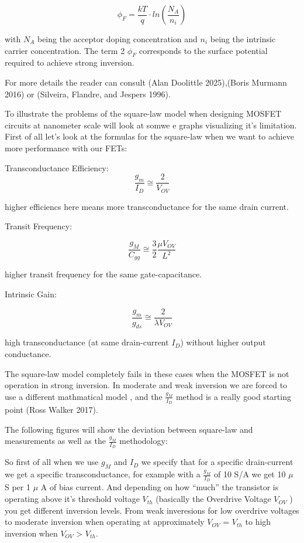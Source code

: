 \documentclass[
  letterpaper,
]{scrbook}
\begin{document}
\[
\phi_F = \frac{kT}{q} \cdot ln (\frac{N_A}{n_i})
\]

with \(N_A\) being the acceptor doping concentration and \(n_i\) being
the intrinsic carrier concentration. The term 2 \(\phi_F\) corresponds
to the surface potential required to achieve strong inversion.

For more details the reader can consult (Alan Doolittle 2025),(Boris
Murmann 2016) or (Silveira, Flandre, and Jespers 1996).

To illustrate the problems of the square-law model when designing MOSFET
circuits at nanometer scale will look at somwe e graphs visualizing it's
limitation. First of all let's look at the formulas for the square-law
when we want to achieve more performance with our FETs:

Transconductance Efficiency: \[
\frac{g_m}{I_D} \cong \frac{2}{V_{OV}}
\]

higher efficiencs here means more transconductance for the same drain
current.

Transit Frequency:

\[
\frac{g_M}{C_{gg}} \cong \frac{3}{2}\frac{\mu V_{OV}}{L^2}
\]

higher transit frequency for the same gate-capacitance.

Intrinsic Gain:

\[
\frac{g_m}{g_{ds}} \cong \frac{2}{\lambda V_{OV}}
\]

high transconductance (at same drain-current \(I_D\)) without higher
output conductance.

The square-law model completely fails in these cases when the MOSFET is
not operation in strong inversion. In moderate and weak inversion we are
forced to use a different mathmatical model , and the
\(\frac{g_M}{I_D}\) method is a really good starting point (Ross Walker
2017).

The following figures will show the deviation between square-law and
measurements as well as the \(\frac{g_M}{I_D}\) methodology:

So first of all when we use \(g_M\) and \(I_D\) we specify that for a
specific drain-current we get a specific transconductance, for example
with a \(\frac{g_M}{I_D}\) of 10 S/A we get 10 \(\mu\) S per 1 \(\mu\) A
of bias current. And depending on how ``much'' the transistor is
operating above it's threshold voltage \(V_{th}\) (basically the
Overdrive Voltage \(V_{OV}\) ) you get different inversion levels. From
weak inveresions for low overdrive voltages to moderate inversion when
operating at approximately \(V_{OV}\) = \(V_{th}\) to high inversion
when \(V_{OV}\) \textgreater{} \(V_{th}\).
\end{document}
